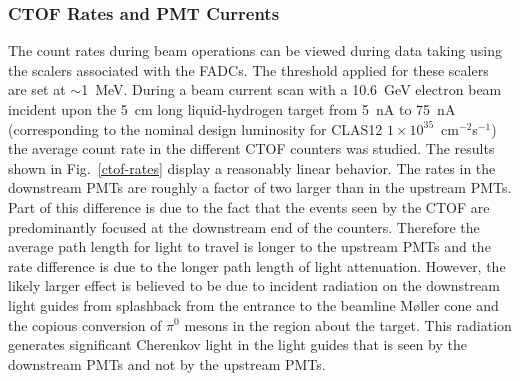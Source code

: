 \documentclass{elsart}
\begin{document}
\subsubsection{CTOF Rates and PMT Currents}

The count rates during beam operations can be viewed during data taking using the scalers
associated with the FADCs. The threshold applied for these scalers are set at $\sim$1~MeV. During
a beam current scan with a 10.6~GeV electron beam incident upon the 5~cm long liquid-hydrogen target
from 5~nA to 75~nA (corresponding to the nominal design luminosity for CLAS12
$1 \times 10^{35}$~cm$^{-2}$s$^{-1}$) the average count rate in the different CTOF counters was
studied. The results shown in Fig.~\ref{ctof-rates} display a reasonably linear behavior. The rates in
the downstream PMTs are roughly a factor of two larger than in the upstream PMTs. Part of this
difference is due to the fact that the events seen by the CTOF are predominantly focused at the
downstream end of the counters. Therefore the average path length for light to travel is longer to
the upstream PMTs and the rate difference is due to the longer path length of light attenuation. However,
the likely larger effect is believed to be due to incident radiation on the downstream light guides from
splashback from the entrance to the beamline M{\o}ller cone and the copious conversion of $\pi^0$
mesons in the region about the target. This radiation generates significant Cherenkov light in the light
guides that is seen by the downstream PMTs and not by the upstream PMTs.
\end{document}

